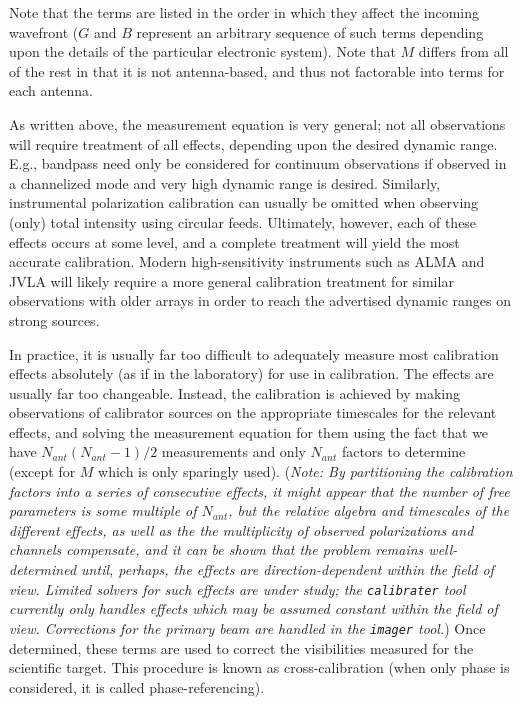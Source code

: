 Note that the terms are listed in the order in which they affect the
incoming wavefront ($G$ and $B$ represent an arbitrary sequence of
such terms depending upon the details of the particular electronic
system). Note that $M$ differs from all of the rest in that it is not
antenna-based, and thus not factorable into terms for each antenna. 

As written above, the measurement equation is very general; not all
observations will require treatment of all effects, depending upon the
desired dynamic range. E.g., bandpass need only be considered for
continuum observations if observed in a channelized mode and very high
dynamic range is desired. Similarly, instrumental polarization
calibration can usually be omitted when observing (only) total
intensity using circular feeds. Ultimately, however, each of these
effects occurs at some level, and a complete treatment will yield the
most accurate calibration. Modern high-sensitivity instruments such as
ALMA and JVLA will likely require a more general calibration treatment
for similar observations with older arrays in order to reach the
advertised dynamic ranges on strong sources. 

In practice, it is usually far too difficult to adequately measure
most calibration effects absolutely (as if in the laboratory) for use
in calibration. The effects are usually far too changeable. Instead,
the calibration is achieved by making observations of calibrator
sources on the appropriate timescales for the relevant effects, and
solving the measurement equation for them using the fact that we have
$N_{ant}(N_{ant}-1)/2$ measurements and only $N_{ant}$ factors to
determine (except for $M$ which is only sparingly used). ({\it Note: By
partitioning the calibration factors into a series of consecutive
effects, it might appear that the number of free parameters is some
multiple of $N_{ant}$, but the relative algebra and timescales of the
different effects, as well as the the multiplicity of observed
polarizations and channels compensate, and it can be shown that the
problem remains well-determined until, perhaps, the effects are
direction-dependent within the field of view. Limited solvers for such
effects are under study; the {\tt calibrater} tool currently only handles
effects which may be assumed constant within the field of
view. Corrections for the primary beam are handled in the {\tt imager}
tool.}) Once determined, these terms are used to correct the
visibilities measured for the scientific target. This procedure is
known as cross-calibration (when only phase is considered, it is
called phase-referencing). 

